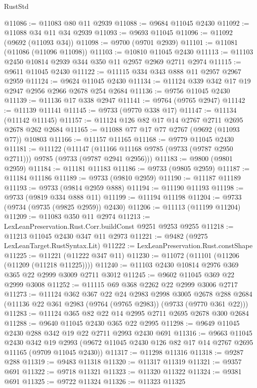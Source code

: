 \begin{lexlean}{RustStd}
\begin{coremodule}
@11086 := @11083 @80 @11 @2939
@11088 := @9684 @11045 @2430
@11092 := @11088 @34 @11 @34 @2939
@11093 := @9693 @11045
@11096 := @11092 (@9692 (@11093 @34))
@11098 := @9700 (@9701 @2939)
@11101 := @11081 (@11086 (@11096 @11098))
@11103 := @10810 @11045 @2430
@11113 := @11103 @2450 @10814 @2939 @344 @350 @11 @2957 @2969 @2711 @2974
@11115 := @9611 @11045 @2430
@11122 := @11115 @334 @343 @888 @11 @2957 @2967 @2959
@11124 := @9624 @11045 @2430
@11134 := @11124 @339 @342 @17 @19 @2947 @2956 @2966 @2678 @254 @2684
@11136 := @9756 @11045 @2430
@11139 := @11136 @17 @338 @2947
@11141 := @9764 (@9765 @2947)
@11142 := @11139 @11141
@11145 := @9733 (@9770 @338 @17)
@11147 := @11134 (@11142 @11145)
@11157 := @11124 @126 @82 @17 @14 @2767 @2711 @2695 @2678 @262 @2684
@11165 := @11088 @77 @17 @77 @2767 (@9692 (@11093 @77)) @10803
@11166 := @11157 @11165
@11168 := @9779 @11045 @2430
@11181 := @11122
    (@11147 (@11166 @11168 @9785 (@9733 (@9787 @2950 @2711))) @9785 (@9733 (@9787 @2941 @2956)))
@11183 := @9800 (@9801 @2959)
@11184 := @11181 @11183
@11186 := @9733 (@9805 @2959)
@11187 := @11184 @11186
@11189 := @9733 (@9810 @2959)
@11190 := @11187 @11189
@11193 := @9733 (@9814 @2959 @888)
@11194 := @11190 @11193
@11198 := @9733 (@9819 @334 @888 @11)
@11199 := @11194 @11198
@11204 := @9733 (@9734 (@9735 (@9825 @2959)) @2430)
@11206 := @11113 (@11199 @11204)
@11209 := @11083 @350 @11 @2974
@11213 := LexLeanPreservation.Rust.Corr.buildConst @9251 @9253 @9255
@11218 := @11213 @11045 @2430 @347 @11 @2973
@11221 := @9482 (@9275 LexLeanTarget.RustSyntax.Lit)
@11222 := LexLeanPreservation.Rust.constShape
@11225 := @11221 (@11222 @347 @11)
@11230 := @11072 (@11101 (@11206 (@11209 (@11218 @11225))))
@11240 := @11103 @2430 @10814 @2976 @369 @365 @22 @2999 @3009 @2711 @3012
@11245 := @9602 @11045 @369 @22 @2999 @3008
@11252 := @11115 @69 @368 @2262 @22 @2999 @3006 @2717
@11273 := @11124
    @362
    @367
    @22
    @24
    @2983
    @2998
    @3005
    @2678
    @288
    @2684
    (@11136 @22 @361 @2983 (@9764 (@9765 @2983)) (@9733 (@9770 @361 @22)))
@11283 := @11124 @365 @82 @22 @14 @2995 @2711 @2695 @2678 @300 @2684
@11288 := @9640 @11045 @2430 @365 @22 @2995
@11298 := @9649 @11045 @2430 @288 @342 @19 @22 @2711 @2993 @2430 @691
@11316 := @9663
    @11045
    @2430
    @342
    @19
    @2993
    (@9672 @11045 @2430 @126 @82 @17 @14 @2767 @2695 @11165 (@9709 @11045 @2430))
@11317 := @11298 @11316
@11318 := @9287 @288
@11319 := @9483 @11318
@11320 := @11317 @11319
@11321 := @9357 @691
@11322 := @9718 @11321
@11323 := @11320 @11322
@11324 := @9381 @691
@11325 := @9722 @11324
@11326 := @11323 @11325

\end{coremodule}
\end{lexlean}
